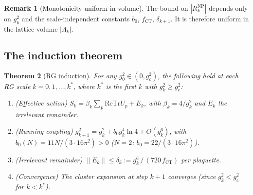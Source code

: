 \documentclass[11pt,a4paper]{amsart}
\newtheorem{theorem}{Theorem}[section]
\theoremstyle{definition}
\newtheorem{remark}[theorem]{Remark}
\newcommand{\re}{\mathrm{Re}}
\newcommand{\Tr}{\mathrm{Tr}}
\newcommand{\norm}[1]{\left\|#1\right\|}
\newcommand{\gB}{g^2_c}
\newcommand{\CT}{\mathrm{CT}}
\begin{document}
\begin{remark}[Monotonicity uniform in volume]
The bound on $|R_k^{\mathrm{NP}}|$ depends only on $g^2_k$ and the
scale-independent constants $b_0$, $f_{\CT}$, $\delta_{k+1}$.
It is therefore uniform in the lattice volume $|\Lambda_k|$.
\end{remark}

\subsection{The induction theorem}

\begin{theorem}[RG induction]
\label{thm:RG}
For any $g^2_0 \in (0, \gB)$, the following hold at each RG scale
$k = 0, 1, \ldots, k^*$, where $k^*$ is the first $k$ with $g^2_k \ge \gB$:
\begin{enumerate}[label=(\Alph*)]
\item\label{itm:action}
      \textup{(Effective action)}
      $S_k = \beta_k \sum_p \re\Tr U_p + E_k$,
      with $\beta_k = 4/g^2_k$ and $E_k$ the irrelevant remainder.
\item\label{itm:running}
      \textup{(Running coupling)}
      $g^2_{k+1} = g^2_k + b_0 g^4_k \ln 4 + O(g^6_k)$,
      with $b_0(N) = 11N/(3\cdot 16\pi^2) > 0$ ($N=2$: $b_0 = 22/(3\cdot 16\pi^2)$).
\item\label{itm:error}
      \textup{(Irrelevant remainder)}
      $\norm{E_k} \le \delta_k := g^6_k\,/\,(720\,f_{\mathrm{CT}})$
      per plaquette.
\item\label{itm:conv}
      \textup{(Convergence)}
      The cluster expansion at step $k+1$ converges
      (since $g^2_k < \gB$ for $k < k^*$).
\end{enumerate}
\end{theorem}
\end{document}
